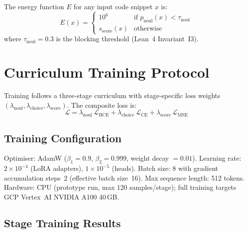 \documentclass[conference]{IEEEtran}
\begin{document}
The energy function $E$ for any input code snippet $x$ is:
\begin{equation}
  E(x) = \begin{cases}
    10^6 & \text{if } p_\text{noul}(x) < \tau_\text{noul} \\
    s_\text{score}(x) & \text{otherwise}
  \end{cases}
\end{equation}
where $\tau_\text{noul} = 0.3$ is the blocking threshold (Lean~4 Invariant~I3).

\section{Curriculum Training Protocol}
\label{sec:training}

Training follows a three-stage curriculum with stage-specific loss weights
$(\lambda_\text{noul}, \lambda_\text{choice}, \lambda_\text{score})$.
The composite loss is:
\begin{equation}
  \mathcal{L} = \lambda_\text{noul}\,\mathcal{L}_\text{BCE}
              + \lambda_\text{choice}\,\mathcal{L}_\text{CE}
              + \lambda_\text{score}\,\mathcal{L}_\text{MSE}
\end{equation}

\subsection{Training Configuration}

Optimiser: AdamW ($\beta_1{=}0.9$, $\beta_2{=}0.999$, weight decay $= 0.01$).
Learning rate: $2 \times 10^{-4}$ (LoRA adapters), $1 \times 10^{-5}$ (heads).
Batch size: 8 with gradient accumulation steps~2 (effective batch size~16).
Max sequence length: 512 tokens. Hardware: CPU (prototype run, max 120 samples/stage);
full training targets GCP Vertex~AI NVIDIA A100 40\,GB.

\subsection{Stage Training Results}
\end{document}
